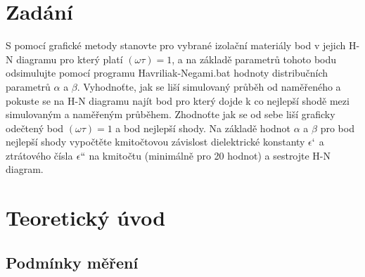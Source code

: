 \documentclass{article}
\begin{document}


\section*{Zadání}
S pomocí grafické metody stanovte pro vybrané izolační materiály bod v jejich H-N diagramu
pro který platí \((\omega \tau) = 1\), a na základě parametrů tohoto bodu odsimulujte pomocí programu
Havriliak-Negami.bat hodnoty distribučních parametrů \(\alpha\) a \(\beta\).
Vyhodnoťte, jak se liší simulovaný průběh od naměřeného a pokuste se na H-N diagramu najít
bod pro který dojde k co nejlepší shodě mezi simulovaným a naměřeným průběhem. Zhodnoťte
jak se od sebe liší graficky odečtený bod \((\omega \tau) = 1\) a bod nejlepší shody.
Na základě hodnot \(\alpha\) a \(\beta\) pro bod nejlepší shody vypočtěte kmitočtovou závislost dielektrické
konstanty \(\epsilon`\) a ztrátového čísla \(\epsilon``\) na kmitočtu (minimálně pro 20 hodnot) a sestrojte H-N
diagram.

\section*{Teoretický úvod}


\newpage
\subsection*{Podmínky měření}
\end{document}
